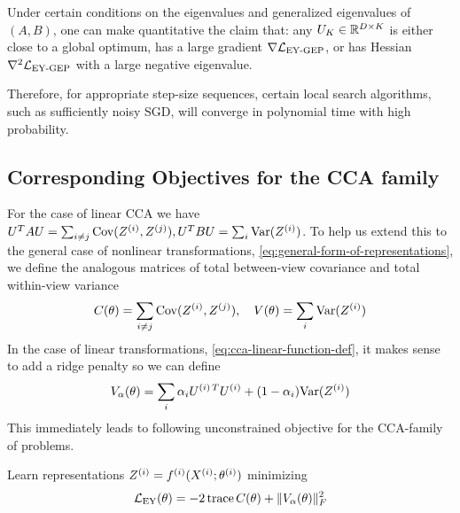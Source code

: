 \begin{corollary}
    Under certain conditions on the eigenvalues and generalized eigenvalues of $(A,B)$, one can make quantitative the claim that:
    any $U_K \in \mathbb{R}^{D \times K}$ is either close to a global optimum, has a large gradient $\nabla \mathcal{L}_\text{EY-GEP}$, or has Hessian $\nabla^2 \mathcal{L}_\text{EY-GEP}$ with a large negative eigenvalue.

    Therefore, for appropriate step-size sequences, certain local search algorithms, such as sufficiently noisy SGD, will converge in polynomial time with high probability.
\end{corollary}

\subsection{Corresponding Objectives for the CCA family}
For the case of linear CCA we have $U^T A U = \sum_{i \neq j} \mathrm{Cov}(Z^{(i)}, Z^{(j)}), U^T B U = \sum_{i} \mathrm{Var}(Z^{(i)})$.
To help us extend this to the general case of nonlinear transformations, \cref{eq:general-form-of-representations}, we define the analogous matrices of total between-view covariance and total within-view variance
\begin{align}\label{eq:def-C-V-matrices}
    \vphantom{\bigl(\bigr)} %
    C(\theta) = \sum_{i \neq j} \Cov(Z\sps{i}, Z\sps{j}), \quad
    V(\theta) = \sum_{i} \Var(Z\sps{i})
\end{align}
In the case of linear transformations, \cref{eq:cca-linear-function-def}, it makes sense to add a ridge penalty so we can define
\begin{align}\label{eq:v-alpha-ridge-definition}
    V_\alpha(\theta) = \sum_i \alpha_i {U^{(i)\,T}} U^{(i)} +  (1 - \alpha_i) \mathrm{Var}(Z^{(i)})
\end{align}
This immediately leads to following unconstrained objective for the CCA-family of problems.
\begin{definition}
    Learn representations $Z^{(i)} = f^{(i)}( X^{(i)}; \theta^{(i)})$ minimizing
    \begin{align}\label{eq:EY-loss-def-C-V}
        \mathcal{L}_\text{EY}(\theta) = - 2 \operatorname{trace} C(\theta) + \lVert V_\alpha(\theta)\rVert_F^2
    \end{align}
\end{definition}

